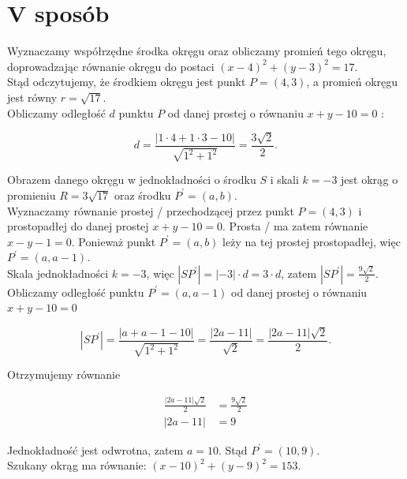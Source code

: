 \documentclass[10pt]{article}
\begin{document}
\section*{V sposób}
Wyznaczamy współrzędne środka okręgu oraz obliczamy promień tego okręgu, doprowadzając równanie okręgu do postaci $(x-4)^{2}+(y-3)^{2}=17$.\\
Stąd odczytujemy, że środkiem okręgu jest punkt $P=(4,3)$, a promień okręgu jest równy $r=\sqrt{17}$.\\
Obliczamy odległość $d$ punktu $P$ od danej prostej o równaniu $x+y-10=0$ :

$$
d=\frac{|1 \cdot 4+1 \cdot 3-10|}{\sqrt{1^{2}+1^{2}}}=\frac{3 \sqrt{2}}{2} .
$$

Obrazem danego okręgu w jednokładności o środku $S$ i skali $k=-3$ jest okrąg o promieniu $R=3 \sqrt{17}$ oraz środku $P^{\prime}=(a, b)$.\\
Wyznaczamy równanie prostej / przechodzącej przez punkt $P=(4,3)$ i prostopadłej do danej prostej $x+y-10=0$. Prosta / ma zatem równanie $x-y-1=0$. Ponieważ punkt $P^{\prime}=(a, b)$ leży na tej prostej prostopadłej, więc $P^{\prime}=(a, a-1)$.\\
Skala jednokładności $k=-3$, więc $\left|S P^{\prime}\right|=|-3| \cdot d=3 \cdot d$, zatem $\left|S P^{\prime}\right|=\frac{9 \sqrt{2}}{2}$.\\
Obliczamy odległość punktu $P^{\prime}=(a, a-1)$ od danej prostej o równaniu $x+y-10=0$

$$
\left|S P^{\prime}\right|=\frac{|a+a-1-10|}{\sqrt{1^{2}+1^{2}}}=\frac{|2 a-11|}{\sqrt{2}}=\frac{|2 a-11| \sqrt{2}}{2} .
$$

Otrzymujemy równanie

$$
\begin{aligned}
\frac{|2 a-11| \sqrt{2}}{2} & =\frac{9 \sqrt{2}}{2} \\
|2 a-11| & =9
\end{aligned}
$$

Jednokładność jest odwrotna, zatem $a=10$. Stąd $P^{\prime}=(10,9)$.\\
Szukany okrąg ma równanie: $(x-10)^{2}+(y-9)^{2}=153$.
\end{document}
